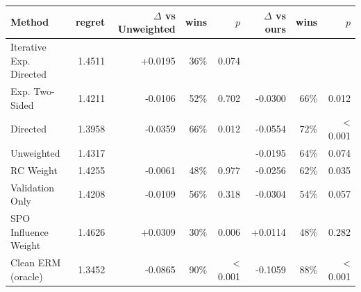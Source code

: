 \begin{tabular}{lrrrrrrr}
\toprule
Method & regret & $\Delta$ vs Unweighted & wins & $p$ & $\Delta$ vs ours & wins & $p$ \\
\midrule
Iterative Exp. Directed & 1.4511 & +0.0195 & 36\% & 0.074 &  &  &  \\
Exp. Two-Sided & 1.4211 & -0.0106 & 52\% & 0.702 & -0.0300 & 66\% & 0.012 \\
Directed & 1.3958 & -0.0359 & 66\% & 0.012 & -0.0554 & 72\% & < 0.001 \\
Unweighted & 1.4317 &  &  &  & -0.0195 & 64\% & 0.074 \\
RC Weight & 1.4255 & -0.0061 & 48\% & 0.977 & -0.0256 & 62\% & 0.035 \\
Validation Only & 1.4208 & -0.0109 & 56\% & 0.318 & -0.0304 & 54\% & 0.057 \\
SPO Influence Weight & 1.4626 & +0.0309 & 30\% & 0.006 & +0.0114 & 48\% & 0.282 \\
Clean ERM (oracle) & 1.3452 & -0.0865 & 90\% & < 0.001 & -0.1059 & 88\% & < 0.001 \\
\bottomrule
\end{tabular}
